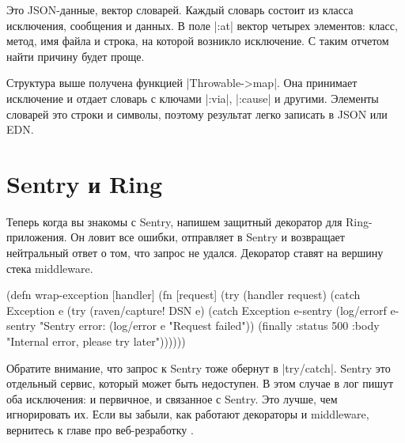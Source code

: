 \begin{english}
  \begin{json}
  \end{json}
\end{english}

Это JSON-данные, вектор словарей. Каждый словарь состоит из класса исключения,
сообщения и данных. В поле \spverb|:at| вектор четырех элементов: класс, метод,
имя файла и строка, на которой возникло исключение. С таким отчетом найти
причину будет проще.

Структура выше получена функцией \spverb|Throwable->map|. Она принимает
исключение и отдает словарь с ключами \spverb|:via|, \spverb|:cause| и
другими. Элементы словарей это строки и символы, поэтому результат легко
записать в JSON или EDN.

\section{Sentry и Ring}

Теперь когда вы знакомы с Sentry, напишем защитный декоратор для
Ring-приложения. Он ловит все ошибки, отправляет в Sentry и возвращает
нейтральный ответ о том, что запрос не удался. Декоратор ставят на вершину стека
middleware.

\begin{english}
  \begin{clojure}
(defn wrap-exception
  [handler]
  (fn [request]
    (try
      (handler request)
      (catch Exception e
        (try
          (raven/capture! DSN e)
          (catch Exception e-sentry
            (log/errorf e-sentry "Sentry error: %
            (log/error e "Request failed"))
          (finally
            {:status 500
             :body "Internal error, please try later"}))))))
  \end{clojure}
\end{english}

Обратите внимание, что запрос к Sentry тоже обернут в \spverb|try/catch|. Sentry
это отдельный сервис, который может быть недоступен. В этом случае в лог пишут
оба исключения: и первичное, и связанное с Sentry. Это лучше, чем игнорировать
их. Если вы забыли, как работают декораторы и middleware, вернитесь к главе про
веб-резработку .

